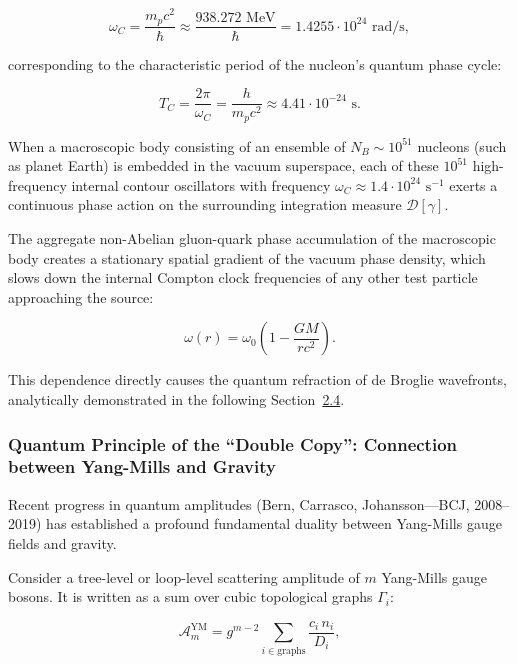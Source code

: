 \documentclass[11pt,a4paper]{article}
\theoremstyle{definition}
\begin{document}
\begin{equation}\label{eq:2.3.50}\tag{2.3.50}
\omega_C = \frac{m_p c^2}{\hbar} \approx \frac{938.272\text{ MeV}}{\hbar} = 1.4255 \cdot 10^{24}\text{ rad/s},
\end{equation}

corresponding to the characteristic period of the nucleon's quantum phase cycle:

\begin{equation}\label{eq:2.3.51}\tag{2.3.51}
T_C = \frac{2\pi}{\omega_C} = \frac{h}{m_p c^2} \approx 4.41 \cdot 10^{-24}\text{ s}.
\end{equation}

When a macroscopic body consisting of an ensemble of $N_B \sim 10^{51}$ nucleons (such as planet Earth) is embedded in the vacuum superspace, each of these $10^{51}$ high-frequency internal contour oscillators with frequency $\omega_C \approx 1.4 \cdot 10^{24}\text{ s}^{-1}$ exerts a continuous phase action on the surrounding integration measure $\mathcal{D}[\gamma]$.

The aggregate non-Abelian gluon-quark phase accumulation of the macroscopic body creates a stationary spatial gradient of the vacuum phase density, which slows down the internal Compton clock frequencies of any other test particle approaching the source:

\begin{equation}\label{eq:2.3.52}\tag{2.3.52}
\omega(r) = \omega_0 \left( 1 - \frac{G M}{r c^2} \right).
\end{equation}

This dependence directly causes the quantum refraction of de Broglie wavefronts, analytically demonstrated in the following Section~\hyperref[sec:2.4]{2.4}.

\subsubsection{Quantum Principle of the ``Double Copy'': Connection between Yang-Mills and Gravity}\label{sec:2.3.9}

Recent progress in quantum amplitudes (Bern, Carrasco, Johansson---BCJ, 2008--2019) has established a profound fundamental duality between Yang-Mills gauge fields and gravity.

Consider a tree-level or loop-level scattering amplitude of $m$ Yang-Mills gauge bosons. It is written as a sum over cubic topological graphs $\Gamma_i$:

\begin{equation}\label{eq:2.3.53}\tag{2.3.53}
\mathcal{A}_{m}^{\text{YM}} = g^{m-2} \sum_{i \in \text{graphs}} \frac{c_i \, n_i}{D_i},
\end{equation}
\end{document}
